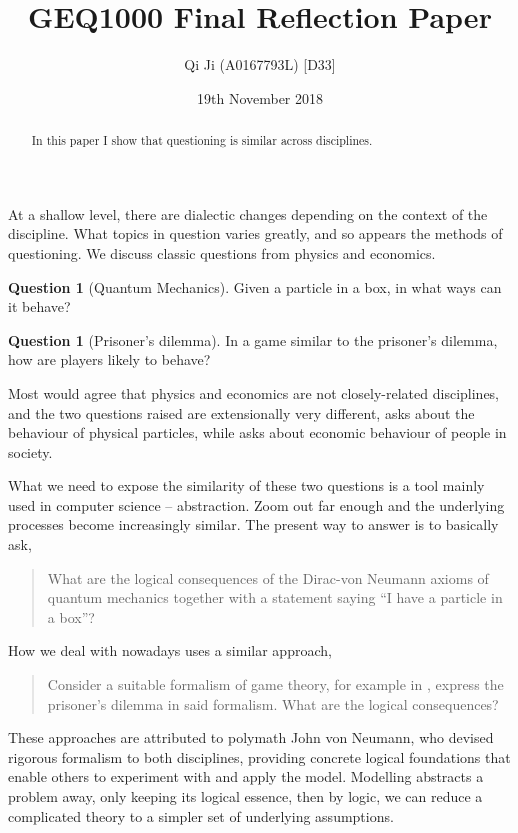 \documentclass[british,a4paper,]{article}
\title{GEQ1000 Final Reflection Paper}
\author{Qi Ji (A0167793L) [D33]}
\date{19th November 2018}
\theoremstyle{definition}
\newtheorem{question}[theorem]{Question}
\theoremstyle{remark}
\begin{document}
\maketitle

\begin{abstract}
    In this paper I show that questioning is similar across disciplines.
\end{abstract}

At a shallow level, there are dialectic changes depending on the context of the discipline.
What topics in question varies greatly, and so appears the methods of questioning.
We discuss classic questions from physics and economics.

\begin{question}[Quantum Mechanics] \label{particleinabox}
    Given a particle in a box, in what ways can it behave?
\end{question}

\begin{question}[Prisoner's dilemma] \label{prisoner}
    In a game similar to the prisoner's dilemma, how are players likely to behave?
\end{question}

Most would agree that physics and economics are not closely-related disciplines, and
the two questions raised are extensionally very different,
 asks about the behaviour of physical particles, while
 asks about economic behaviour of people in society.

What we need to expose the similarity of these two questions is a tool mainly used in computer science -- abstraction.
Zoom out far enough and the underlying processes become increasingly similar.
The present way to answer  is to basically ask,
\begin{quote}
    What are the logical consequences of the Dirac-von Neumann axioms of quantum mechanics\autocite{vonNeumannQM}
    together with a statement saying ``I have a particle in a box''?
\end{quote}
How we deal with  nowadays uses a similar approach,
\begin{quote}
    Consider a suitable formalism of game theory, for example in \autocite{vonNeumannGame},
    express the prisoner's dilemma in said formalism.
    What are the logical consequences?
\end{quote}
These approaches are attributed to polymath John von Neumann, who devised rigorous formalism to both disciplines,
providing concrete logical foundations that enable others to experiment with and apply the model.
Modelling abstracts a problem away, only keeping its logical essence, then by logic, we can
reduce a complicated theory to a simpler set of underlying assumptions.
\end{document}
